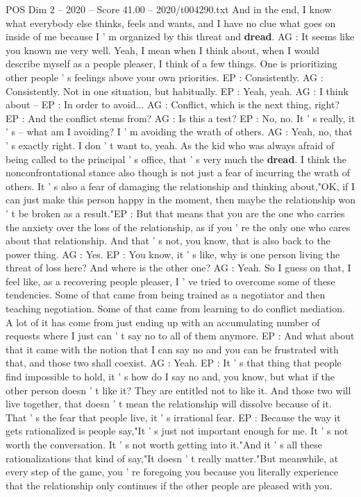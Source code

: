 \begin{textsample}{POS Dim 2 – 2020 – Score 41.00 – 2020/t004290.txt}
And in the end, I know what everybody else thinks, feels and wants, and I have no clue what goes on inside of me because I ' m organized by this threat and \textbf{dread}.
AG : It seems like you known me very well.
Yeah, I mean when I think about, when I would describe myself as a people pleaser, I think of a few things.
One is prioritizing other people ' s feelings above your own priorities.
EP : Consistently.
AG : Consistently.
Not in one situation, but habitually.
EP : Yeah, yeah.
AG : I think about -- EP : In order to avoid...
AG : Conflict, which is the next thing, right?
EP : And the conflict stems from?
AG : Is this a test?
EP : No, no.
It ' s really, it ' s -- what am I avoiding?
I ' m avoiding the wrath of others.
AG : Yeah, no, that ' s exactly right.
I don ' t want to, yeah.
As the kid who was always afraid of being called to the principal ' s office, that ' s very much the \textbf{dread}.
I think the nonconfrontational stance also though is not just a fear of incurring the wrath of others.
It ' s also a fear of damaging the relationship and thinking about,"OK, if I can just make this person happy in the moment, then maybe the relationship won ' t be broken as a result."EP : But that means that you are the one who carries the anxiety over the loss of the relationship, as if you ' re the only one who cares about that relationship.
And that ' s not, you know, that is also back to the power thing.
AG : Yes.
EP : You know, it ' s like, why is one person living the threat of loss here?
And where is the other one?
AG : Yeah.
So I guess on that, I feel like, as a recovering people pleaser, I ' ve tried to overcome some of these tendencies.
Some of that came from being trained as a negotiator and then teaching negotiation.
Some of that came from learning to do conflict mediation.
A lot of it has come from just ending up with an accumulating number of requests where I just can ' t say no to all of them anymore.
EP : And what about that it came with the notion that I can say no and you can be frustrated with that, and those two shall coexist.
AG : Yeah.
EP : It ' s that thing that people find impossible to hold, it ' s how do I say no and, you know, but what if the other person doesn ' t like it?
They are entitled not to like it.
And those two will live together, that doesn ' t mean the relationship will dissolve because of it.
That ' s the fear that people live, it ' s irrational fear.
EP : Because the way it gets rationalized is people say,"It ' s just not important enough for me.
It ' s not worth the conversation.
It ' s not worth getting into it."And it ' s all these rationalizations that kind of say,"It doesn ' t really matter."But meanwhile, at every step of the game, you ' re foregoing you because you literally experience that the relationship only continues if the other people are pleased with you.

\end{textsample}
